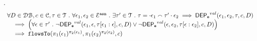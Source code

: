 %
\begin{lem}.
		\label{lem:inv_indepevents}
		\[
		\begin{array}{l}
			\forall D \in \dbdom , c \in \cdom, \trace \in \mathcal{T} \st \forall \event_1, \event_2 \in \eventset^{\asn} \st
			 \exists \trace' \in \mathcal{T} \st \trace = \cdot \event_1 \tracecat \trace' \cdot \event_2
			\implies
			\eventdep^{val}(\event_1, \event_2, \trace, c, D) 
			\\ \quad 
			\implies 
			\left( \forall \event \in \trace' \st \neg \eventdep^{val}(\event_1, \event, \trace[\event_1:\event], c, D)
			\lor \neg \eventdep^{val}(\event, \event_2, \trace[\event:\event_2], c, D) 
			\right) 
			\\ \quad 
			\implies 
			\flowsto(\pi_1(\event_1)^{\pi_2(\event_1)}, \pi_1(\event_2)^{\pi_2(\event_2)}, c)
		\end{array}
		\]
\end{lem}
%
